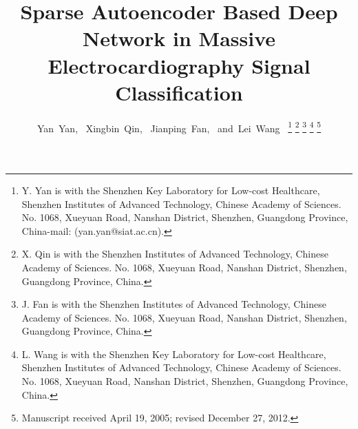 \documentclass[journal]{IEEEtran}
\begin{document}
%
\title{Sparse Autoencoder Based Deep Network in Massive Electrocardiography Signal Classification}
%
%
%

\author{Yan~Yan,~
        Xingbin~Qin,~
        Jianping~Fan,~
        and~Lei~Wang~%
\thanks{Y. Yan is with the Shenzhen Key Laboratory for Low-cost Healthcare, Shenzhen Institutes of Advanced Technology, Chinese Academy of Sciences. No. 1068, Xueyuan Road, Nanshan District,
Shenzhen, Guangdong Province, China-mail: (yan.yan@siat.ac.cn).}%
\thanks{X. Qin is with the Shenzhen Institutes of Advanced Technology, Chinese Academy of Sciences.
No. 1068, Xueyuan Road, Nanshan District, Shenzhen, Guangdong Province, China.}%
\thanks{J. Fan is with the Shenzhen Institutes of Advanced Technology, Chinese Academy of Sciences. No. 1068, Xueyuan Road, Nanshan District, Shenzhen, Guangdong Province, China.}%
\thanks{L. Wang is with the Shenzhen Key Laboratory for Low-cost Healthcare, Shenzhen Institutes of Advanced Technology, Chinese Academy of Sciences.
No. 1068, Xueyuan Road, Nanshan District,
Shenzhen, Guangdong Province, China.}%
\thanks{Manuscript received April 19, 2005; revised December 27, 2012.}}

% 
%
\end{document}
